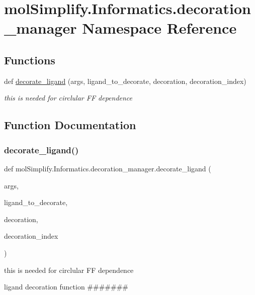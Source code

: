 \hypertarget{namespacemolSimplify_1_1Informatics_1_1decoration__manager}{}\section{mol\+Simplify.\+Informatics.\+decoration\+\_\+manager Namespace Reference}
\label{namespacemolSimplify_1_1Informatics_1_1decoration__manager}
\subsection*{Functions}
\begin{DoxyCompactItemize}
\item 
def \hyperlink{namespacemolSimplify_1_1Informatics_1_1decoration__manager_a2d7ac9cff711295b74426d57328ad90d}{decorate\+\_\+ligand} (args, ligand\+\_\+to\+\_\+decorate, decoration, decoration\+\_\+index)
\begin{DoxyCompactList}\small\item\em this is needed for circlular FF dependence \end{DoxyCompactList}\end{DoxyCompactItemize}


\subsection{Function Documentation}
\mbox{\label{namespacemolSimplify_1_1Informatics_1_1decoration__manager_a2d7ac9cff711295b74426d57328ad90d}} 
\subsubsection{\texorpdfstring{decorate\+\_\+ligand()}{decorate\_ligand()}}
{\footnotesize\ttfamily def mol\+Simplify.\+Informatics.\+decoration\+\_\+manager.\+decorate\+\_\+ligand (\begin{DoxyParamCaption}\item[{}]{args,  }\item[{}]{ligand\+\_\+to\+\_\+decorate,  }\item[{}]{decoration,  }\item[{}]{decoration\+\_\+index }\end{DoxyParamCaption})}



this is needed for circlular FF dependence 

ligand decoration function \#\#\#\#\#\#\# 